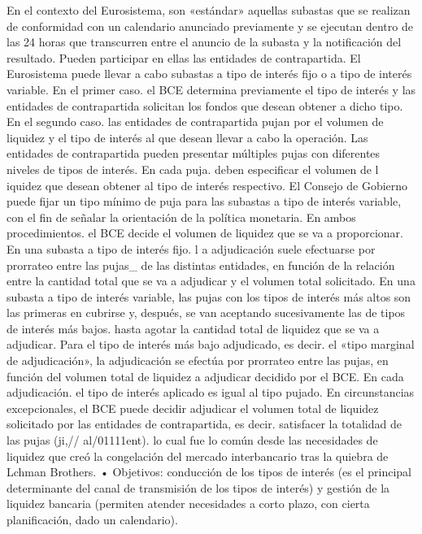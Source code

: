 \documentclass[10pt,a4paper]{article}
\begin{document}
{{    En el contexto del Eurosistema, son «estándar» aquellas subastas que se realizan de conformidad con un calendario anunciado previamente y se ejecutan dentro de las 24 horas que transcurren entre el anuncio de la subasta y la notificación del resultado. Pueden participar en ellas las entidades de contrapartida. El Eurosistema puede llevar a cabo subastas a tipo de interés fijo o a tipo de interés variable. En el primer caso. el BCE determina previamente el tipo de interés y las entidades de contrapartida solicitan los fondos que desean obtener a dicho tipo. En el segundo caso. las entidades de contrapartida pujan por el volumen de liquidez y el tipo de interés al que desean llevar a cabo la operación. Las entidades de contrapartida pueden presentar múltiples pujas con diferentes niveles de tipos de interés. En cada puja. deben especificar el volumen de l iquidez que desean obtener al tipo de interés respectivo. El Consejo de Gobierno puede fijar un tipo mínimo de puja para las subastas a tipo de interés variable, con el fin de señalar la orientación de la política monetaria. En ambos procedimientos. el BCE decide el volumen de liquidez que se va a proporcionar. En una subasta a tipo de interés fijo. l a adjudicación suele efectuarse por prorrateo entre las pujas_ de las distintas entidades, en función de la relación entre la cantidad total que se va a adjudicar y el volumen total solicitado. En una subasta a tipo de interés variable, las pujas con los tipos de interés más altos son las primeras en cubrirse y, después, se van aceptando sucesivamente las de tipos de interés más bajos. hasta agotar la cantidad total de liquidez que se va a adjudicar. Para el tipo de interés más bajo adjudicado, es decir. el «tipo marginal de adjudicación», la adjudicación se efectúa por prorrateo entre las pujas, en función del volumen total de liquidez a adjudicar decidido por el BCE. En cada adjudicación. el tipo de interés aplicado es igual al tipo pujado. En circunstancias excepcionales, el BCE puede decidir adjudicar el volumen total de liquidez solicitado por las entidades de contrapartida, es decir. satisfacer la totalidad de las pujas (ji,// al/01111ent). lo cual fue lo común desde las necesidades de liquidez que creó la congelación del mercado interbancario tras la quiebra de Lchman Brothers.
} • Objetivos: conducción de los tipos de interés (es el principal determinante del canal de transmisión de los tipos de interés) y gestión de la liquidez bancaria (permiten atender necesidades a corto plazo, con cierta planificación, dado un calendario).

}
\end{document}
